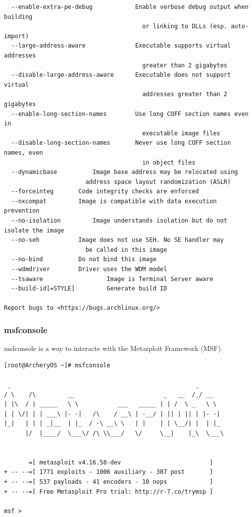 \documentclass{article}
\begin{document}
\begin{lstlisting}
  --enable-extra-pe-debug            Enable verbose debug output when building
                                       or linking to DLLs (esp. auto-import)
  --large-address-aware              Executable supports virtual addresses
                                       greater than 2 gigabytes
  --disable-large-address-aware      Executable does not support virtual
                                       addresses greater than 2 gigabytes
  --enable-long-section-names        Use long COFF section names even in
                                       executable image files
  --disable-long-section-names       Never use long COFF section names, even
                                       in object files
  --dynamicbase			 Image base address may be relocated using
				       address space layout randomization (ASLR)
  --forceinteg		 Code integrity checks are enforced
  --nxcompat		 Image is compatible with data execution prevention
  --no-isolation		 Image understands isolation but do not isolate the image
  --no-seh			 Image does not use SEH. No SE handler may
				       be called in this image
  --no-bind			 Do not bind this image
  --wdmdriver		 Driver uses the WDM model
  --tsaware                  Image is Terminal Server aware
  --build-id[=STYLE]         Generate build ID

Report bugs to <https://bugs.archlinux.org/>
\end{lstlisting}

\subsubsection{msfconsole}
msfconsole is a way to interacte with the Metasploit Framework (MSF).
\begin{lstlisting}
[root@ArcheryOS ~]# msfconsole
                                                  
 _                                                    _
/ \    /\         __                         _   __  /_/ __
| |\  / | _____   \ \           ___   _____ | | /  \ _   \ \
| | \/| | | ___\ |- -|   /\    / __\ | -__/ | || | || | |- -|
|_|   | | | _|__  | |_  / -\ __\ \   | |    | | \__/| |  | |_
      |/  |____/  \___\/ /\ \\___/   \/     \__|    |_\  \___\


       =[ metasploit v4.16.58-dev                         ]
+ -- --=[ 1771 exploits - 1006 auxiliary - 307 post       ]
+ -- --=[ 537 payloads - 41 encoders - 10 nops            ]
+ -- --=[ Free Metasploit Pro trial: http://r-7.co/trymsp ]

msf >
\end{lstlisting}
\end{document}

